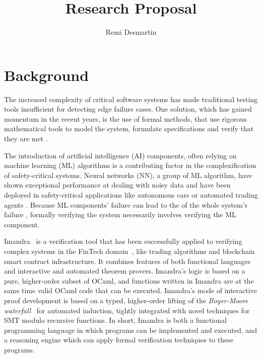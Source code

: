 \documentclass[]{article}
\title{Research Proposal}
\author{Remi Desmartin}
\begin{document}
\maketitle

\iffalse
\begin{abstract}

\end{abstract}
\fi

\section{Background}
The increased complexity of critical software systems has made traditional testing tools insufficient for detecting edge failure cases. One solution, which has gained momentum in the recent years, is the use of formal methods, that use rigorous mathematical tools to model the system, formulate specifications and verify that they are met \cite{amazon_paper}. 

The introduction of artificial intelligence (AI) components, often relying on machine learning (ML) algorithms is a contributing factor in the complexification of safety-critical systems. Neural networks (NN), a group of ML algorithm, have shown exceptional performance at dealing with noisy data and have been deployed in safety-critical applications like autonomous cars \cite{} or automated trading agents \cite{bao}. Because ML components' failure can lead to the of the whole system's failure \cite{car_paper}, formally verifying the system necessarily involves verifying the ML component.

Imandra~\cite{PassmoreCIABKKM20} is a verification tool that has been successfully applied to verifying complex systems in the FinTech
domain~\cite{Passmore21}, like trading algorithms and blockchain smart contract infrastructure. 
It combines features of both functional languages and interactive and automated theorem 
provers. Imandra's logic is based on a pure, higher-order subset of OCaml, and
functions written in Imandra are at the same time valid OCaml code that can be
executed. Imandra's mode of interactive proof
development is based on a typed, higher-order lifting of the \emph{Boyer-Moore
	waterfall}~\cite{BM79} for automated induction, tightly integrated with novel
techniques for SMT modulo recursive functions. 
In short, Imandra is both a functional programming language in which programs can be implemented and executed, and a reasoning engine which can apply formal verification techniques to these programs.
\end{document}
